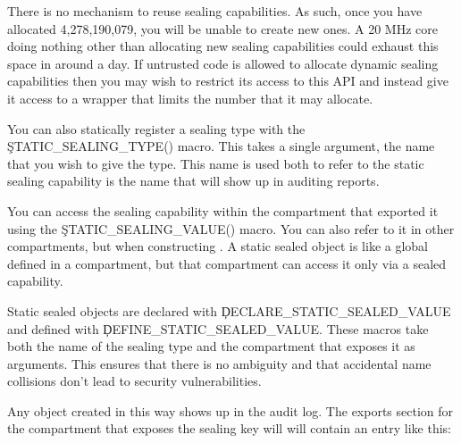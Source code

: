 \begin{caution}
There is no mechanism to reuse sealing capabilities.
As such, once you have allocated 4,278,190,079, you will be unable to create new ones.
A 20 MHz core doing nothing other than allocating new sealing capabilities could exhaust this space in around a day.
If untrusted code is allowed to allocate dynamic sealing capabilities then you may wish to restrict its access to this API and instead give it access to a wrapper that limits the number that it may allocate.
\end{caution}


You can also statically register a sealing type with the \c{STATIC_SEALING_TYPE()} macro.
This takes a single argument, the name that you wish to give the type.
This name is used both to refer to the static sealing capability is the name that will show up in auditing reports.


You can access the sealing capability within the compartment that exported it using the \c{STATIC_SEALING_VALUE()} macro.
You can also refer to it in other compartments, but  when constructing .
A static sealed object is like a global defined in a compartment, but that compartment can access it only via a sealed capability.

Static sealed objects are declared with \c{DECLARE_STATIC_SEALED_VALUE} and defined with \c{DEFINE_STATIC_SEALED_VALUE}.
These macros take both the name of the sealing type and the compartment that exposes it as arguments.
This ensures that there is no ambiguity and that accidental name collisions don't lead to security vulnerabilities.



Any object created in this way shows up in the audit log.
The exports section for the compartment that exposes the sealing key will will contain an entry like this:

\begin{jsonsnippet}
{
  "export_symbol": "__export.sealing_type.alloc.MallocKey",
  "exported": true,
  "kind": "SealingKey"
\},
\end{jsonsnippet}


